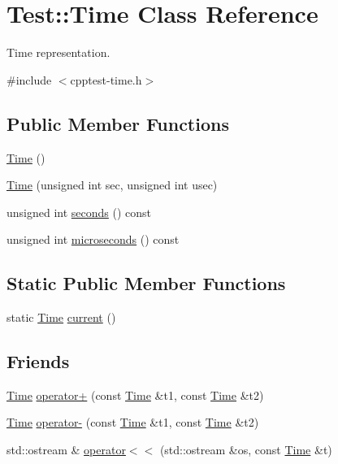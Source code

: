 \hypertarget{class_test_1_1_time}{}\section{Test\+:\+:Time Class Reference}
\label{class_test_1_1_time}


Time representation.  




{\ttfamily \#include $<$cpptest-\/time.\+h$>$}

\subsection*{Public Member Functions}
\begin{DoxyCompactItemize}
\item 
\mbox{\hyperlink{class_test_1_1_time_ae5c1089d2eb013c5b908ea95d924b733}{Time}} ()
\item 
\mbox{\hyperlink{class_test_1_1_time_afdc9c0556b8d71ecd8d621c2512154a5}{Time}} (unsigned int sec, unsigned int usec)
\item 
unsigned int \mbox{\hyperlink{class_test_1_1_time_a75a6145c4502fc9c1a3f5171c6536b07}{seconds}} () const
\item 
unsigned int \mbox{\hyperlink{class_test_1_1_time_a49a77156512509bea4bb49b614a5ecc8}{microseconds}} () const
\end{DoxyCompactItemize}
\subsection*{Static Public Member Functions}
\begin{DoxyCompactItemize}
\item 
static \mbox{\hyperlink{class_test_1_1_time}{Time}} \mbox{\hyperlink{class_test_1_1_time_a83422a11d27c17a7a4bc52ab14fdb9a3}{current}} ()
\end{DoxyCompactItemize}
\subsection*{Friends}
\begin{DoxyCompactItemize}
\item 
\mbox{\hyperlink{class_test_1_1_time}{Time}} \mbox{\hyperlink{class_test_1_1_time_ae2e555aa5b5c51e44b576d8baf48a2cd}{operator+}} (const \mbox{\hyperlink{class_test_1_1_time}{Time}} \&t1, const \mbox{\hyperlink{class_test_1_1_time}{Time}} \&t2)
\item 
\mbox{\hyperlink{class_test_1_1_time}{Time}} \mbox{\hyperlink{class_test_1_1_time_a09225563b0b317910b26c550ba74de64}{operator-\/}} (const \mbox{\hyperlink{class_test_1_1_time}{Time}} \&t1, const \mbox{\hyperlink{class_test_1_1_time}{Time}} \&t2)
\item 
std\+::ostream \& \mbox{\hyperlink{class_test_1_1_time_a0287b008277738b9882ed96467e8b4f8}{operator$<$$<$}} (std\+::ostream \&os, const \mbox{\hyperlink{class_test_1_1_time}{Time}} \&t)
\end{DoxyCompactItemize}


